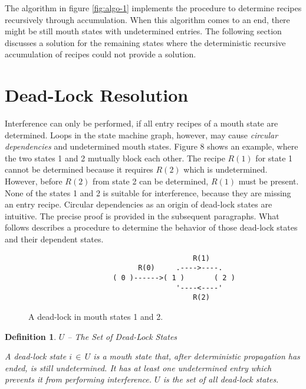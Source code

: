 \documentclass[12pt,a4paper]{scrartcl}
\newtheorem{definition}{Definition}
\begin{document}
The algorithm in figure \ref{fig:algo-1} implements the procedure to determine
recipes recursively through accumulation.  When this algorithm comes to an end,
there might be still mouth states with undetermined entries.  The following
section discusses a solution for the remaining states where the deterministic
recursive accumulation of recipes could not provide a solution.

%
\section{Dead-Lock Resolution}

Interference can only be performed, if all entry recipes of a mouth state are
determined. Loops in the state machine graph, however, may cause
\textit{circular dependencies} and undetermined mouth states.  Figure 8 shows
an example, where the two states 1 and 2 mutually block each other. The recipe
$R(1)$ for state 1 cannot be determined because it requires $R(2)$ which is
undetermined. However, before $R(2)$ from state 2 can be determined, $R(1)$
must be present. None of the states 1 and 2 is suitable for interference,
because they are missing an entry recipe.  Circular dependencies as an origin
of dead-lock states are intuitive. The precise proof is provided in the
subsequent paragraphs. What follows describes a procedure to determine the
behavior of those dead-lock states and their dependent states.

\begin{figure}[htbp] \leavevmode
\begin{verbatim}
                                       R(1)
                          R(0)     .---->----.
                    ( 0 )------>( 1 )       ( 2 )
                                   '----<----'
                                       R(2)

\end{verbatim}
\caption{A dead-lock in mouth states 1 and 2.}
\end{figure}

\begin{definition} $U$ -- The Set of Dead-Lock States

A dead-lock state $i\,\in\,U$ is a mouth state that, after deterministic
propagation has ended, is still undetermined. It has at least one undetermined
entry which prevents it from performing interference. $U$ is the set of all
dead-lock states.

\end{definition}
\end{document}
